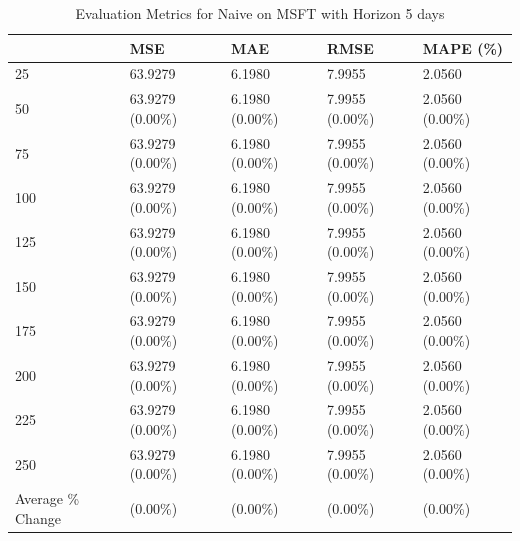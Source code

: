 \begin{table}
\caption{Evaluation Metrics for Naive on MSFT with Horizon 5 days}
\label{tab:naive_MSFT_h5_metrics}
\begin{tabular}{lllll}
\toprule
 & MSE & MAE & RMSE & MAPE (\%) \\
\midrule
25 & 63.9279 & 6.1980 & 7.9955 & 2.0560 \\
50 & 63.9279 (0.00\%) & 6.1980 (0.00\%) & 7.9955 (0.00\%) & 2.0560 (0.00\%) \\
75 & 63.9279 (0.00\%) & 6.1980 (0.00\%) & 7.9955 (0.00\%) & 2.0560 (0.00\%) \\
100 & 63.9279 (0.00\%) & 6.1980 (0.00\%) & 7.9955 (0.00\%) & 2.0560 (0.00\%) \\
125 & 63.9279 (0.00\%) & 6.1980 (0.00\%) & 7.9955 (0.00\%) & 2.0560 (0.00\%) \\
150 & 63.9279 (0.00\%) & 6.1980 (0.00\%) & 7.9955 (0.00\%) & 2.0560 (0.00\%) \\
175 & 63.9279 (0.00\%) & 6.1980 (0.00\%) & 7.9955 (0.00\%) & 2.0560 (0.00\%) \\
200 & 63.9279 (0.00\%) & 6.1980 (0.00\%) & 7.9955 (0.00\%) & 2.0560 (0.00\%) \\
225 & 63.9279 (0.00\%) & 6.1980 (0.00\%) & 7.9955 (0.00\%) & 2.0560 (0.00\%) \\
250 & 63.9279 (0.00\%) & 6.1980 (0.00\%) & 7.9955 (0.00\%) & 2.0560 (0.00\%) \\
Average \% Change & (0.00\%) & (0.00\%) & (0.00\%) & (0.00\%) \\
\bottomrule
\end{tabular}
\end{table}
